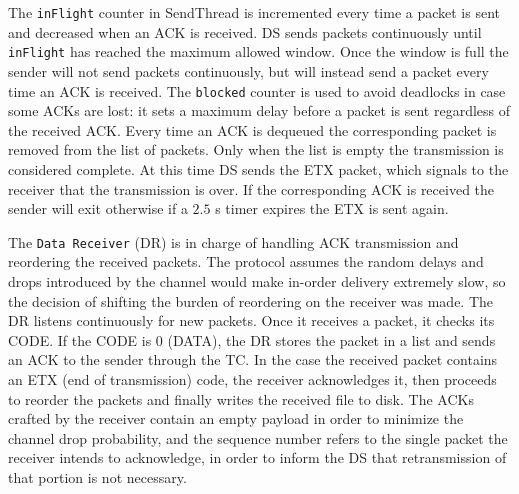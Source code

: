 \documentclass[10pt,twocolumn]{article}
\begin{document}
The \texttt{inFlight} counter in SendThread is incremented every time
a packet is sent and decreased when an ACK is received. DS sends packets
continuously until \texttt{inFlight} has reached the maximum allowed window.
Once the window is full the sender will not send packets continuously, but will instead
send a packet every time an ACK is received. The \texttt{blocked} counter is
used to avoid deadlocks in case some ACKs are lost: it sets a maximum delay
before a packet is sent regardless of the received ACK.
Every time an ACK is dequeued the corresponding packet is removed from the
list of packets. Only when the list is empty the transmission is considered
complete. At this time DS sends the ETX packet, which signals to the receiver
that the transmission is over. If the corresponding ACK is received the sender
will exit otherwise if a $2.5$ s timer expires the ETX is sent again.

The \texttt{Data Receiver} (DR) is in charge of handling ACK transmission and reordering the received packets. The protocol assumes the random delays and drops introduced by the channel would make in-order delivery extremely slow, so the decision of shifting the burden of reordering on the receiver was made. The DR listens continuously for new packets. Once it receives a packet, it checks its CODE. If the CODE is 0 (DATA), the DR stores the packet in a list and sends an ACK to the sender through the TC. In the case the received packet contains an ETX (end of transmission) code, the receiver acknowledges it, then proceeds to reorder the packets and finally writes the received file to disk. The ACKs crafted by the receiver contain an empty payload in order to minimize the channel drop probability, and the sequence number refers to the single packet the receiver intends to acknowledge, in order to inform the DS that retransmission of that portion is not necessary.
\end{document}
